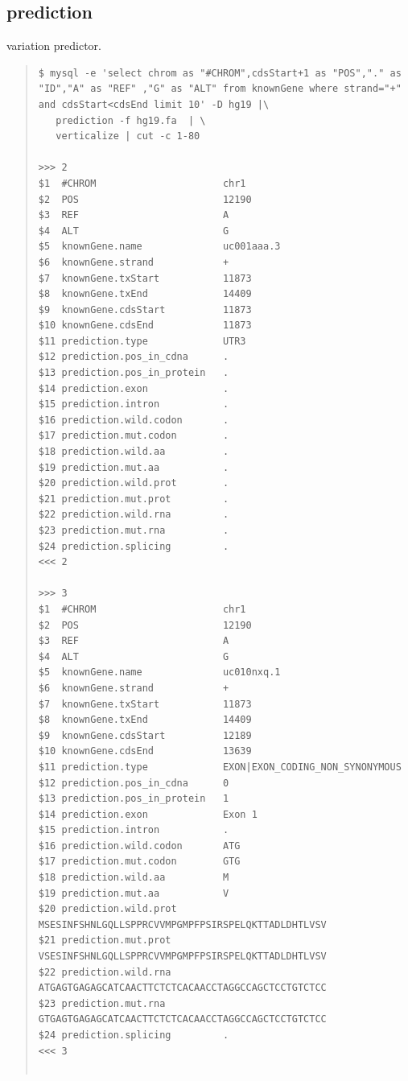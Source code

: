 \documentclass[12pt]{article}
\begin{document}
\subsection{prediction}
variation predictor.

\begin{quote}
\begin{verbatim}
$ mysql -e 'select chrom as "#CHROM",cdsStart+1 as "POS","." as "ID","A" as "REF" ,"G" as "ALT" from knownGene where strand="+" and cdsStart<cdsEnd limit 10' -D hg19 |\
   prediction -f hg19.fa  | \
   verticalize | cut -c 1-80
   
>>>	2
$1	#CHROM                   	chr1
$2	POS                      	12190
$3	REF                      	A
$4	ALT                      	G
$5	knownGene.name           	uc001aaa.3
$6	knownGene.strand         	+
$7	knownGene.txStart        	11873
$8	knownGene.txEnd          	14409
$9	knownGene.cdsStart       	11873
$10	knownGene.cdsEnd         	11873
$11	prediction.type          	UTR3
$12	prediction.pos_in_cdna   	.
$13	prediction.pos_in_protein	.
$14	prediction.exon          	.
$15	prediction.intron        	.
$16	prediction.wild.codon    	.
$17	prediction.mut.codon     	.
$18	prediction.wild.aa       	.
$19	prediction.mut.aa        	.
$20	prediction.wild.prot     	.
$21	prediction.mut.prot      	.
$22	prediction.wild.rna      	.
$23	prediction.mut.rna       	.
$24	prediction.splicing      	.
<<<	2

>>>	3
$1	#CHROM                   	chr1
$2	POS                      	12190
$3	REF                      	A
$4	ALT                      	G
$5	knownGene.name           	uc010nxq.1
$6	knownGene.strand         	+
$7	knownGene.txStart        	11873
$8	knownGene.txEnd          	14409
$9	knownGene.cdsStart       	12189
$10	knownGene.cdsEnd         	13639
$11	prediction.type          	EXON|EXON_CODING_NON_SYNONYMOUS
$12	prediction.pos_in_cdna   	0
$13	prediction.pos_in_protein	1
$14	prediction.exon          	Exon 1
$15	prediction.intron        	.
$16	prediction.wild.codon    	ATG
$17	prediction.mut.codon     	GTG
$18	prediction.wild.aa       	M
$19	prediction.mut.aa        	V
$20	prediction.wild.prot     	MSESINFSHNLGQLLSPPRCVVMPGMPFPSIRSPELQKTTADLDHTLVSV
$21	prediction.mut.prot      	VSESINFSHNLGQLLSPPRCVVMPGMPFPSIRSPELQKTTADLDHTLVSV
$22	prediction.wild.rna      	ATGAGTGAGAGCATCAACTTCTCTCACAACCTAGGCCAGCTCCTGTCTCC
$23	prediction.mut.rna       	GTGAGTGAGAGCATCAACTTCTCTCACAACCTAGGCCAGCTCCTGTCTCC
$24	prediction.splicing      	.
<<<	3


\end{verbatim}
\end{quote}
\end{document}

